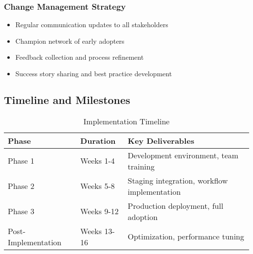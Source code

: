 \subsubsection{Change Management Strategy}
\begin{itemize}
    \item Regular communication updates to all stakeholders
    \item Champion network of early adopters
    \item Feedback collection and process refinement
    \item Success story sharing and best practice development
\end{itemize}

\subsection{Timeline and Milestones}

\begin{table}[H]
\centering
\begin{tabular}{|l|l|l|}
\hline
\textbf{Phase} & \textbf{Duration} & \textbf{Key Deliverables} \\
\hline
Phase 1 & Weeks 1-4 & Development environment, team training \\
\hline
Phase 2 & Weeks 5-8 & Staging integration, workflow implementation \\
\hline
Phase 3 & Weeks 9-12 & Production deployment, full adoption \\
\hline
Post-Implementation & Weeks 13-16 & Optimization, performance tuning \\
\hline
\end{tabular}
\caption{Implementation Timeline}
\label{tab:timeline}
\end{table}
